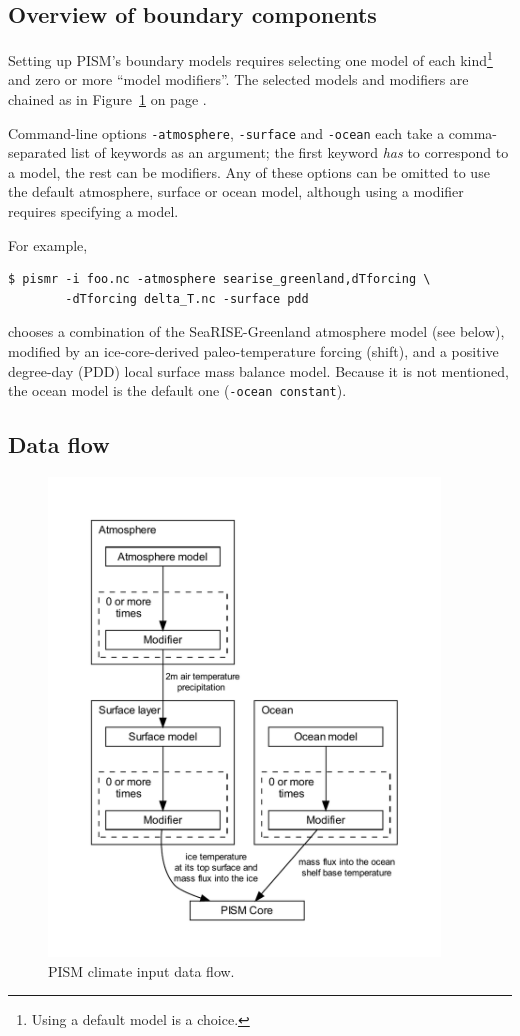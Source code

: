 \documentclass[titlepage,letterpaper,final]{scrartcl}
\begin{document}
\subsection{Overview of boundary components}
\label{sec:overview}

Setting up PISM's boundary models requires selecting one model of each kind\footnote{Using a default model is a choice.} and zero or more ``model modifiers''.  The selected models and modifiers are chained as in Figure~\ref{fig:climate-input-data-flow} on page \pageref{fig:climate-input-data-flow}.

Command-line options \texttt{-atmosphere}, \texttt{-surface} and \texttt{-ocean} each take a comma-separated list of keywords as an argument; the first keyword \emph{has} to correspond to a model, the rest can be modifiers. Any of these options can be omitted to use the default atmosphere, surface or ocean model, although using a modifier requires specifying a model.

For example,
\begin{verbatim}
$ pismr -i foo.nc -atmosphere searise_greenland,dTforcing \
        -dTforcing delta_T.nc -surface pdd
\end{verbatim}%
chooses a combination of the SeaRISE-Greenland atmosphere model (see below), modified by an ice-core-derived paleo-temperature forcing (shift), and a positive degree-day (PDD) local surface mass balance model.  Because it is not mentioned, the ocean model is the default one (\texttt{-ocean constant}).

\subsection{Data flow}
\label{sec:data-flow}

\begin{figure}
  \centering
  \includegraphics[height=5in]{figs/data-flow.pdf}
  \caption{PISM climate input data flow.}
  \label{fig:climate-input-data-flow}
\end{figure}
\end{document}

